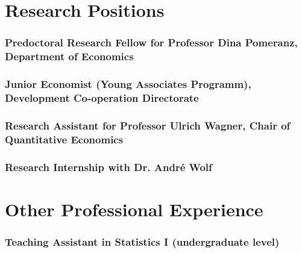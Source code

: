 \documentclass[a4paper, english, 10pt]{cv_class}
\begin{document}
\section{Research Positions}

\subsubsection{Predoctoral Research Fellow for Professor Dina Pomeranz, Department of Economics}

\subsubsection{Junior Economist (Young Associates Programm), Development Co-operation Directorate}

\subsubsection{Research Assistant for Professor Ulrich Wagner, Chair of Quantitative Economics}

\subsubsection{Research Internship with Dr. André Wolf}


\section{Other Professional Experience}

\subsubsection{Teaching Assistant in Statistics I (undergraduate level)}
  
\end{document}
